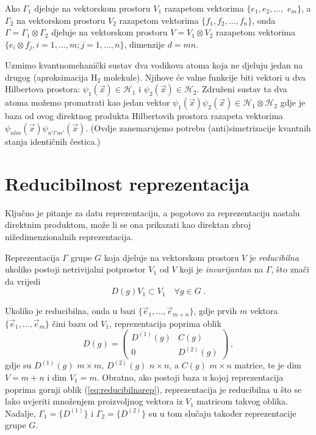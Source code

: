 Ako $\Gamma_1$ djeluje na vektorskom prostoru $V_1$ razapetom
vektorima $\{e_1, e_2, \ldots,$ $e_m\}$, a $\Gamma_2$ na vektorskom
prostoru $V_2$ razapetom vektorima $\{f_1, f_2, \ldots, f_n\}$,
onda $\Gamma=\Gamma_1 \otimes \Gamma_2$ djeluje na vektorskom
prostoru $V=V_1 \otimes V_2$ razapetom vektorima
$\{e_{i}\otimes f_{j}, i=1,\ldots, m; j=1,\ldots, n\}$,
dimenzije $d=mn$.

\begin{primjer}
Uzmimo kvantnomehanički sustav dva vodikova atoma koja ne djeluju jedan
na drugog (aproksimacija H$_2$ molekule). Njihove će valne funkcije 
biti vektori u dva Hilbertova prostora:
$\psi_{1}(\vec{x})\in \mathcal{H}_1$ i 
$\psi_{2}(\vec{x})\in \mathcal{H}_2$.
Združeni sustav ta dva atoma možemo promatrati kao jedan vektor
$\psi_{1}(\vec{x})\psi_{2}(\vec{x}) \in \mathcal{H}_1
\otimes \mathcal{H}_2$ gdje je baza od ovog direktnog
produkta Hilbertovih prostora razapeta vektorima
$\psi_{nlm}(\vec{x})\psi_{n'l'm'}(\vec{x})$. (Ovdje zanemarujemo
potrebu (anti)simetrizacije kvantnih stanja identičnih čestica.)
\end{primjer}


\section{Reducibilnost reprezentacija}

Ključno je pitanje za datu reprezentaciju, a pogotovo za reprezentaciju
nastalu direktnim produktom, može li se ona prikazati kao direktan
zbroj nižedimenzionalnih reprezentacija. 
\begin{definicija}
Reprezentacija $\Gamma$ grupe $G$ koja djeluje na vektorskom
prostoru $V$  je \emph{reducibilna} ukoliko postoji netrivijalni
potprostor $V_{1}$ od $V$ koji je \emph{invarijantan} na $\Gamma$,
što znači da vrijedi 
\begin{displaymath}
    D(g)V_{1}\subset V_{1} \quad \forall g \in G \;.
\end{displaymath}
\end{definicija}
Ukoliko je reducibilna,
onda u bazi $\{\vec{e}_1, \ldots, \vec{e}_{m+n} \}$, gdje prvih $m$
vektora $\{\vec{e}_1, \ldots,\allowbreak \vec{e}_{m} \}$ čini bazu od
$V_1$, reprezentacija poprima oblik
\begin{equation}
 D(g) = \begin{pmatrix}
  D^{(1)}(g) & C(g) \\
     0       & D^{(2)}(g) 
\end{pmatrix} \,,
\label{eq:reducibilnarep}
\end{equation}
gdje su $D^{(1)}(g)$ $m\times m$, $D^{(2)}(g)$ $n\times n$,
a $C(g)$ $m\times n$ matrice, te je dim $V=m+n$ i dim $V_1=m$.
Obratno, ako postoji baza u kojoj reprezentacija poprima
gornji oblik (\ref{eq:reducibilnarep}), reprezentacija je reducibilna
u što se lako uvjeriti množenjem proizvoljnog vektora iz $V_1$ matricom
takvog oblika.
Nadalje, $\Gamma_1=\{D^{(1)}\}$ i $\Gamma_2=\{D^{(2)}\}$ su u tom
slučaju također reprezentacije grupe $G$.

